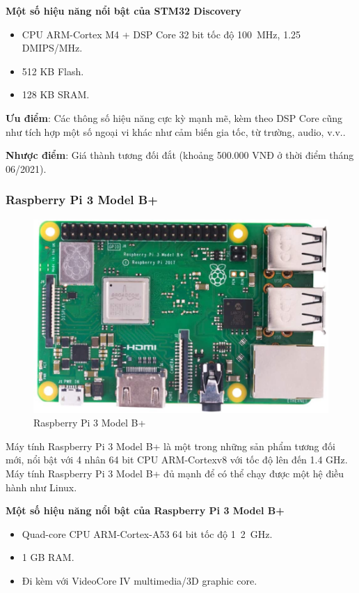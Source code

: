 \textbf{Một số hiệu năng nổi bật của STM32 Discovery}
\begin{itemize}
    \item CPU ARM-Cortex M4 + DSP Core 32 bit tốc độ \si{100\MHz}, 1.25 DMIPS/MHz.
    \item 512 KB Flash.
    \item 128 KB SRAM.
\end{itemize}

\textbf{Ưu điểm}: Các thông số hiệu năng cực kỳ mạnh mẽ, kèm theo DSP Core cũng như tích hợp một số ngoại vi khác như cảm biến gia tốc, từ trường, audio, v.v..

\textbf{Nhược điểm}: Giá thành tương đối đắt (khoảng 500.000 VNĐ ở thời điểm tháng 06/2021).

\subsubsection{Raspberry Pi 3 Model B+}
\begin{figure}[ht]
\centering
\includegraphics[scale=0.25]{images/raspberry-pi-model-3bplus.jpg}
\caption{Raspberry Pi 3 Model B+}
\end{figure}
Máy tính Raspberry Pi 3 Model B+ \cite{raspberry_datasheet} là một trong những sản phẩm tương đối mới, nổi bật với 4 nhân 64 bit CPU ARM-Cortexv8 với tốc độ lên đến 1.4 GHz.
Máy tính Raspberry Pi 3 Model B+ đủ mạnh để có thể chạy được một hệ điều hành như Linux.

\textbf{Một số hiệu năng nổi bật của Raspberry Pi 3 Model B+}
\begin{itemize}
    \item Quad-core CPU ARM-Cortex-A53 64 bit tốc độ \si{1.2\GHz}.
    \item 1 GB RAM.
    \item Đi kèm với VideoCore IV multimedia/3D graphic core.
\end{itemize}

